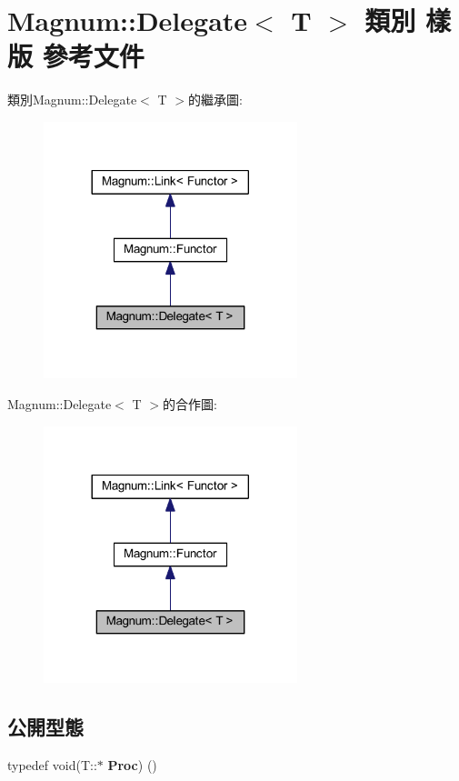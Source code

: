 \hypertarget{class_magnum_1_1_delegate}{}\section{Magnum\+:\+:Delegate$<$ T $>$ 類別 樣版 參考文件}
\label{class_magnum_1_1_delegate}


類別\+Magnum\+:\+:Delegate$<$ T $>$的繼承圖\+:\nopagebreak
\begin{figure}[H]
\begin{center}
\leavevmode
\includegraphics[width=209pt]{class_magnum_1_1_delegate__inherit__graph}
\end{center}
\end{figure}


Magnum\+:\+:Delegate$<$ T $>$的合作圖\+:\nopagebreak
\begin{figure}[H]
\begin{center}
\leavevmode
\includegraphics[width=209pt]{class_magnum_1_1_delegate__coll__graph}
\end{center}
\end{figure}
\subsection*{公開型態}
\begin{DoxyCompactItemize}
\item 
typedef void(T\+::$\ast$ {\bfseries Proc}) ()\hypertarget{class_magnum_1_1_delegate_a9192ad8710be34957b68a524242763a8}{}\label{class_magnum_1_1_delegate_a9192ad8710be34957b68a524242763a8}

\end{DoxyCompactItemize}
